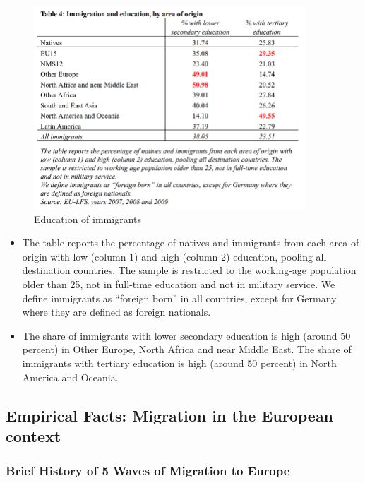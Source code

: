             \begin{figure}[H]
                \centering
                \includegraphics[width=4in]{images/ch11/6.png}
                \caption{Education of immigrants}
            \end{figure}
            \begin{itemize}
                 \item The table reports the percentage of natives and immigrants from each area of origin with low (column 1) and high (column 2) education, pooling all destination countries. The sample is restricted to the working-age population older than 25, not in full-time education and not in military service. We define immigrants as “foreign born” in all countries, except for Germany where they are defined as foreign nationals.
                 \item The share of immigrants with lower secondary education is high (around 50 percent) in Other Europe,  North Africa and near Middle East. The share of immigrants with tertiary education is high (around 50 percent) in North America and Oceania.
            \end{itemize}

    \subsection{Empirical Facts: Migration in the European context}

        \subsubsection{Brief History of 5 Waves of Migration to Europe}

